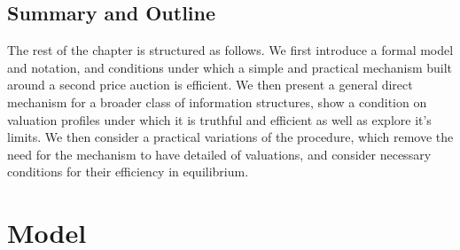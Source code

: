 






\subsection{Summary and Outline}


The rest of the chapter is structured as follows.
We first introduce a formal model and notation, and conditions under which a simple and practical mechanism built around a second price auction is efficient.
We then present a general direct mechanism for a broader class of information structures, show a condition on valuation profiles under which it is truthful and efficient as well as explore it's limits. 
We then consider a practical variations of the procedure, which remove the need for the mechanism to have detailed of valuations, and consider necessary conditions for their efficiency in equilibrium.  

\section{Model}

